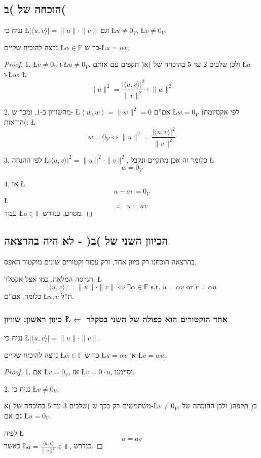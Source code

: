\documentclass[english,hebrew]{article}
\begin{document}
\subsection{הוכחה של )ב(}

נניח כי \L{$\left|\langle u,v\rangle\right|=\|u\|\cdot\|v\|$} וגם
\L{$u\neq0_{V}$}, \L{$v\neq0_{V}$}. 

נרצה להוכיח שקיים \L{$\alpha\in\mathbb{F}$} כך ש-\L{$u=\alpha v$}.
\begin{proof}
1. \L{$v\neq0_{V}$} ו-\L{$u\neq0_{V}$}, ולכן שלבים 2 עד 5 בהוכחה
של )א( תקפים עם אותם \L{$a$} ו-\L{$w$}: \L{%
\[
\|u\|^{2}=\frac{\left|\langle u,v\rangle\right|^{2}}{\|v\|^{2}}+\|w\|^{2}
\]
}%

2. מהשוויון ב-1, ומכך ש- \L{$\left\langle w,w\right\rangle =\|w\|^{2}=0$}
אם\textquotedblright ם \L{$w=0_{V}$} )לפי אקסיומת הודאות(: \L{%
\[
w=0_{V}\iff\|u\|^{2}=\frac{\left|\langle u,v\rangle\right|^{2}}{\|v\|^{2}}
\]
}%

3. לפי ההנחה \L{$\left|\langle u,v\rangle\right|^{2}=\|u\|^{2}\cdot\|v\|^{2}$},
כלומר זה אכן מתקיים ונקבל \L{%
\[
w=0_{V}
\]
}%

4. אז \L{%
\[
u-av=0_{V}
\]
}%
\L{%
\[
\therefore\quad u=av
\]
}%
עבור \L{$a\in\mathbb{F}$} מסוים, כנדרש. 
\end{proof}

\subsection{הכיוון השני של )ב( - לא היה בהרצאה}

בהרצאה הוכחנו רק כיוון אחד, ורק עבור וקטורים שונים מוקטור האפס.

הגרסה המלאה, כמו אצל אקסלר: \L{%
\[
\left|\langle u,v\rangle\right|=\|u\|\cdot\|v\|\iff\exists\alpha\in\mathbb{F}\text{ s.t. }u=\alpha v\text{ or }v=\alpha u
\]
}%
כלומר, אם\textquotedblright ם \L{$u,v$} ת\textquotedblright ל.

\subsubsection{כיוון ראשון: שוויון \L{$\Leftarrow$} אחד הוקטורים הוא כפולה של השני
בסקלר}

נניח כי \L{$\left|\langle u,v\rangle\right|=\|u\|\cdot\|v\|$}.

נרצה להוכיח שקיים \L{$\alpha\in\mathbb{F}$} כך ש-\L{$u=\alpha v$}
או \L{$v=\alpha u$}.
\begin{proof}
1. אם \L{$v=0_{V}$}, אז \L{$v=0\cdot u$}, וסיימנו.

2. נניח כי \L{$v\neq0_{V}$}. 

שלבים 3 עד 5 בהוכחה של )א( משתמשים רק בכך ש-\L{$v\neq0_{V}$}, ולכן
ההוכחה של )ב( תקפה גם אם \L{$u=0_{V}$}. 

לפיה \L{%
\[
u=av
\]
}%
כאשר \L{$a=\frac{\langle u,v\rangle}{\|v\|^{2}}\in\mathbb{F}$}, כנדרש. 
\end{proof}
\end{document}
